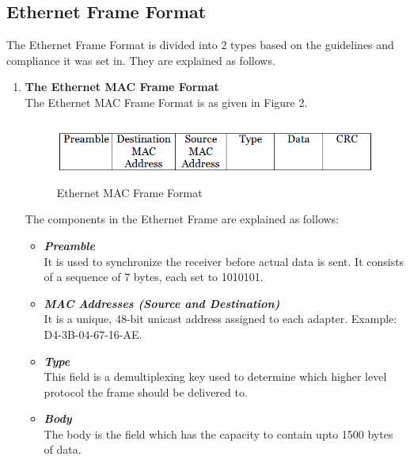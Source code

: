\documentclass[12pt]{article}
\begin{document}
\subsection{Ethernet Frame Format}
The Ethernet Frame Format is divided into 2 types based on the guidelines and compliance it was set in. They are explained as follows.
\begin{enumerate}
    \item \textbf{The Ethernet MAC Frame Format} \\
        The Ethernet MAC Frame Format is as given in Figure 2.
        \begin{figure}
            \centering
            \includegraphics[width=15cm, height=2cm]{ethernet_frame.png}
            \caption{Ethernet MAC Frame Format}
        \end{figure}
        
        The components in the Ethernet Frame are explained as follows:
        \begin{itemize}
            \item \textbf{\textit{Preamble}} \\
                It is used to synchronize the receiver before actual data is sent. It consists of a sequence of 7 bytes, each set to 1010101.
            \item \textbf{\textit{MAC Addresses (Source and Destination)}} \\
                It is a unique, 48-bit unicast address assigned to each adapter. Example: D4-3B-04-67-16-AE.
            \item \textbf{\textit{Type}} \\
                This field is a demultiplexing key used to determine which higher level protocol the frame should be delivered to.
            \item \textbf{\textit{Body}} \\
                The body is the field which has the capacity to contain upto 1500 bytes of data.
        \end{itemize}
        

\end{enumerate}
\end{document}
